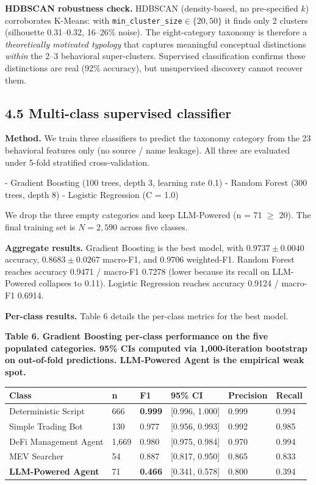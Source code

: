 \documentclass[sigconf,nonacm=false]{acmart}
\begin{document}
\textbf{HDBSCAN robustness check.} HDBSCAN (density-based, no pre-specified $k$) corroborates K-Means: with \texttt{min\_cluster\_size}$\in\{20, 50\}$ it finds only 2 clusters (silhouette 0.31--0.32, 16--26\% noise). The eight-category taxonomy is therefore a \emph{theoretically motivated typology} that captures meaningful conceptual distinctions \emph{within} the 2--3 behavioral super-clusters. Supervised classification confirms these distinctions are real (92\% accuracy), but unsupervised discovery cannot recover them.

\subsection{4.5 Multi-class supervised classifier}

\textbf{Method.} We train three classifiers to predict the taxonomy category from the 23 behavioral features only (no source / name leakage). All three are evaluated under 5-fold stratified cross-validation.

- Gradient Boosting (100 trees, depth 3, learning rate 0.1)
- Random Forest (300 trees, depth 8)
- Logistic Regression (C = 1.0)

We drop the three empty categories and keep LLM-Powered (n = 71 $\geq$ 20). The final training set is $N = 2{,}590$ across five classes.

\textbf{Aggregate results.} Gradient Boosting is the best model, with $0.9737 \pm 0.0040$ accuracy, $0.8683 \pm 0.0267$ macro-F1, and $0.9706$ weighted-F1. Random Forest reaches accuracy 0.9471 / macro-F1 0.7278 (lower because its recall on LLM-Powered collapses to 0.11). Logistic Regression reaches accuracy 0.9124 / macro-F1 0.6914.

\textbf{Per-class results.} Table 6 details the per-class metrics for the best model.

\textbf{Table 6. Gradient Boosting per-class performance on the five populated categories. 95\% CIs computed via 1,000-iteration bootstrap on out-of-fold predictions. LLM-Powered Agent is the empirical weak spot.}

\begin{table}[h]
\centering
\small
\begin{tabular}{llllll}
\toprule
Class & n & F1 & 95\% CI & Precision & Recall \\
\midrule
Deterministic Script & 666 & \textbf{0.999} & [0.996, 1.000] & 0.999 & 0.994 \\
Simple Trading Bot & 130 & 0.977 & [0.956, 0.993] & 0.992 & 0.985 \\
DeFi Management Agent & 1,669 & 0.980 & [0.975, 0.984] & 0.970 & 0.994 \\
MEV Searcher & 54 & 0.887 & [0.817, 0.950] & 0.865 & 0.833 \\
\textbf{LLM-Powered Agent} & 71 & \textbf{0.466} & [0.341, 0.578] & 0.800 & 0.394 \\
\bottomrule
\end{tabular}
\end{table}
\end{document}
